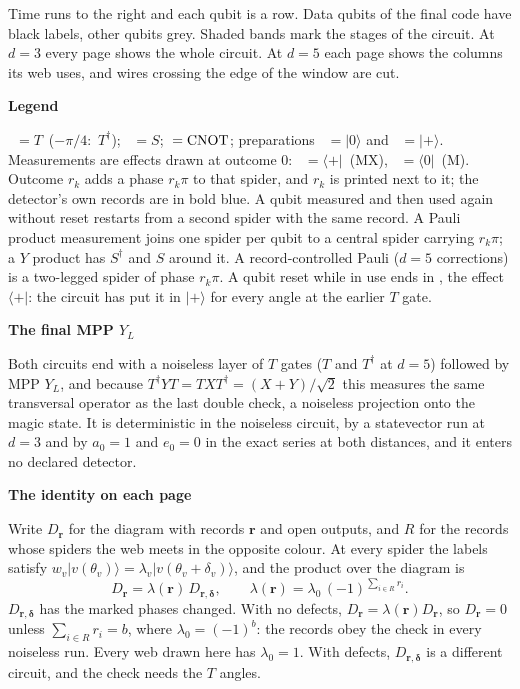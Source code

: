 \documentclass[11pt]{article}
\begin{document}
\begin{semiwebaddition}
\begin{minipage}[t]{.49\linewidth}
Time runs to the right and each qubit is a row. Data qubits of the final code
have black labels, other qubits grey. Shaded bands mark the stages of the circuit.
At $d=3$ every page shows the whole circuit. At $d=5$ each page shows the columns
its web uses, and wires crossing the edge of the window are cut.

\textbf{Legend}\quad
{}

\mbox{ ${}=T$ ($-\pi/4$: $T^\dagger$)};
\mbox{ ${}=S$};
\mbox{\semiwebCaptionCnot ${}={\rm CNOT}$};
preparations \mbox{ ${}=|0\rangle$}
and \mbox{ ${}=|+\rangle$}.
Measurements are effects drawn at outcome 0:
\mbox{ ${}=\langle+|$ (MX)},
\mbox{ ${}=\langle0|$ (M)}.
Outcome $r_k$ adds a phase $r_k\pi$ to that spider, and $r_k$ is printed next to
it; the detector's own records are in bold blue. A qubit measured and then used
again without reset restarts from a second spider with the same record. A Pauli
product measurement joins one spider per qubit to a central spider carrying
$r_k\pi$; a $Y$ product has $S^\dagger$ and $S$ around it. A record-controlled
Pauli ($d=5$ corrections) is a two-legged spider of phase $r_k\pi$. A qubit reset
while in use ends in , the effect $\langle+|$: the circuit
has put it in $|+\rangle$ for every angle at the earlier $T$ gate.

\textbf{The final MPP $Y_L$}

Both circuits end with a noiseless layer of $T$ gates ($T$ and $T^\dagger$ at $d=5$)
followed by MPP $Y_L$, and because $T^\dagger YT=TXT^\dagger=(X+Y)/\sqrt2$ this
measures the same transversal operator as the last double check, a noiseless
projection onto the magic state. It is deterministic in the noiseless circuit,
by a statevector run at $d=3$ and by $a_0=1$ and $e_0=0$ in the exact series at
both distances, and it enters no declared detector.

\textbf{The identity on each page}

Write $D_{\boldsymbol r}$ for the diagram with records $\boldsymbol r$ and open
outputs, and $R$ for the records whose spiders the web meets in the opposite
colour. At every spider the labels satisfy
$w_v|v(\theta_v)\rangle=\lambda_v|v(\theta_v+\delta_v)\rangle$, and the product
over the diagram is
\[
 D_{\boldsymbol r}=\lambda(\boldsymbol r)\,D_{\boldsymbol r,\boldsymbol\delta},
 \qquad \lambda(\boldsymbol r)=\lambda_0\,(-1)^{\sum_{i\in R} r_i}.
\]
$D_{\boldsymbol r,\boldsymbol\delta}$ has the marked phases changed. With no
defects, $D_{\boldsymbol r}=\lambda(\boldsymbol r)D_{\boldsymbol r}$, so
$D_{\boldsymbol r}=0$ unless $\sum_{i\in R}r_i=b$, where $\lambda_0=(-1)^b$:
the records obey the check in every noiseless run. Every web drawn here has
$\lambda_0=1$. With defects, $D_{\boldsymbol r,\boldsymbol\delta}$ is a different
circuit, and the check needs the $T$ angles.


\end{minipage}
\end{semiwebaddition}
\end{document}
